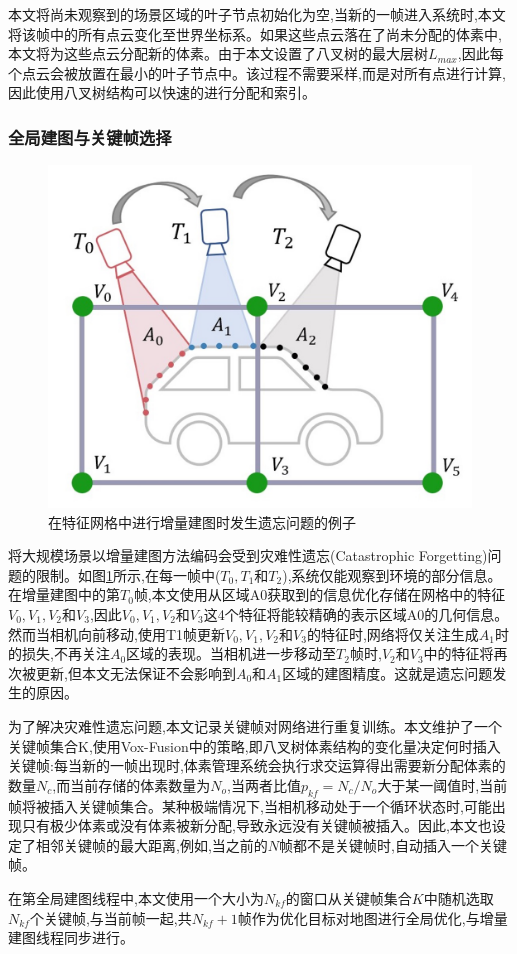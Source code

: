 本文将尚未观察到的场景区域的叶子节点初始化为空,当新的一帧进入系统时,本文将该帧中的所有点云变化至世界坐标系。如果这些点云落在了尚未分配的体素中,本文将为这些点云分配新的体素。由于本文设置了八叉树的最大层树$L_{max}$,因此每个点云会被放置在最小的叶子节点中。该过程不需要采样,而是对所有点进行计算,因此使用八叉树结构可以快速的进行分配和索引。
\subsubsection{全局建图与关键帧选择}
\begin{figure}[htbp]
    \includegraphics[scale = 0.2]{figures/forgetting.jpg}
    \centering
    \caption{在特征网格中进行增量建图时发生遗忘问题的例子} \label{forgetting}
\end{figure}
将大规模场景以增量建图方法编码会受到灾难性遗忘(Catastrophic Forgetting)问题的限制。如图\ref{forgetting}所示,在每一帧中($T_0, T_1$和$T_2$),系统仅能观察到环境的部分信息。在增量建图中的第$T_0$帧,本文使用从区域A0获取到的信息优化存储在网格中的特征$V_0, V_1, V_2$和$V_3$,因此$V_0, V_1, V_2$和$V_3$这4个特征将能较精确的表示区域A0的几何信息。然而当相机向前移动,使用T1帧更新$V_0, V_1, V_2$和$V_3$的特征时,网络将仅关注生成$A_1$时的损失,不再关注$A_0$区域的表现。当相机进一步移动至$T_2$帧时,$V_2$和$V_3$中的特征将再次被更新,但本文无法保证不会影响到$A_0$和$A_1$区域的建图精度。这就是遗忘问题发生的原因。

为了解决灾难性遗忘问题,本文记录关键帧对网络进行重复训练。本文维护了一个关键帧集合K,使用Vox-Fusion中的策略,即八叉树体素结构的变化量决定何时插入关键帧:每当新的一帧出现时,体素管理系统会执行求交运算得出需要新分配体素的数量$N_c$,而当前存储的体素数量为$N_o$,当两者比值$p_{kf}=N_c/N_o$大于某一阈值时,当前帧将被插入关键帧集合。某种极端情况下,当相机移动处于一个循环状态时,可能出现只有极少体素或没有体素被新分配,导致永远没有关键帧被插入。因此,本文也设定了相邻关键帧的最大距离,例如,当之前的$N$帧都不是关键帧时,自动插入一个关键帧。

在第全局建图线程中,本文使用一个大小为$N_{kf}$的窗口从关键帧集合$K$中随机选取$N_{kf}$个关键帧,与当前帧一起,共$N_{kf}+1$帧作为优化目标对地图进行全局优化,与增量建图线程同步进行。
